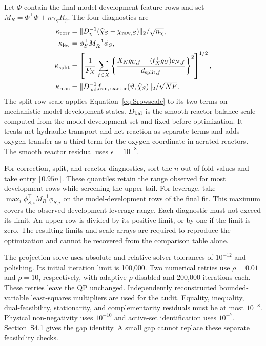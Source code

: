 \documentclass[a4paper,fleqn]{cas-sc}
\begin{document}
Let $\Phi$ contain the final model-development feature rows and set $M_R=\Phi^\top\Phi+n\gamma_SR_\phi$. The four diagnostics are
\begin{align}
\kappa_{\rm corr}&=\|D_\chi^{-1}(\widehat\chi_S-\chi_{{\rm raw},S})\|_2/\sqrt{n_\chi},\notag\\
\kappa_{\rm lev}&=\phi_S^\top M_R^{-1}\phi_S,\notag\\
\kappa_{\rm split}&=\left[\frac{1}{F_X}\sum_{f\in X}\left\{\frac{X_Ng_{U,f}-(t_X^\top g_U)c_{N,f}}{d_{{\rm split},f}}\right\}^{2}\right]^{1/2},\notag\\
\kappa_{\rm reac}&=\|D_{\rm bal}^{-1}f_{{\rm sm},{\rm reactor}}(\vartheta,\widehat\chi_S)\|_2/\sqrt{NF}.
\label{eq:Strust}
\end{align}
The split-row scale applies Equation~\eqref{eq:Srowscale} to its two terms on mechanistic model-development states. $D_{\rm bal}$ is the smooth reactor-balance scale computed from the model-development set and fixed before optimization. It treats net hydraulic transport and net reaction as separate terms and adds oxygen transfer as a third term for the oxygen coordinate in aerated reactors. The smooth reactor residual uses $\epsilon=10^{-8}$.

For correction, split, and reactor diagnostics, sort the $n$ out-of-fold values and take entry $\lceil0.95n\rceil$. These quantiles retain the range observed for most development rows while screening the upper tail. For leverage, take $\max_i\phi_{S,i}^{\top}M_R^{-1}\phi_{S,i}$ on the model-development rows of the final fit. This maximum covers the observed development leverage range. Each diagnostic must not exceed its limit. An upper row is divided by its positive limit, or by one if the limit is zero. The resulting limits and scale arrays are required to reproduce the optimization and cannot be recovered from the comparison table alone.

The projection solve uses absolute and relative solver tolerances of $10^{-12}$ and polishing. Its initial iteration limit is 100,000. Two numerical retries use $\rho=0.01$ and $\rho=10$, respectively, with adaptive $\rho$ disabled and 200,000 iterations each. These retries leave the QP unchanged. Independently reconstructed bounded-variable least-squares multipliers are used for the audit. Equality, inequality, dual-feasibility, stationarity, and complementarity residuals must be at most $10^{-8}$. Physical non-negativity uses $10^{-10}$ and active-set identification uses $10^{-7}$. Section~S4.1 gives the gap identity. A small gap cannot replace these separate feasibility checks.
\end{document}
